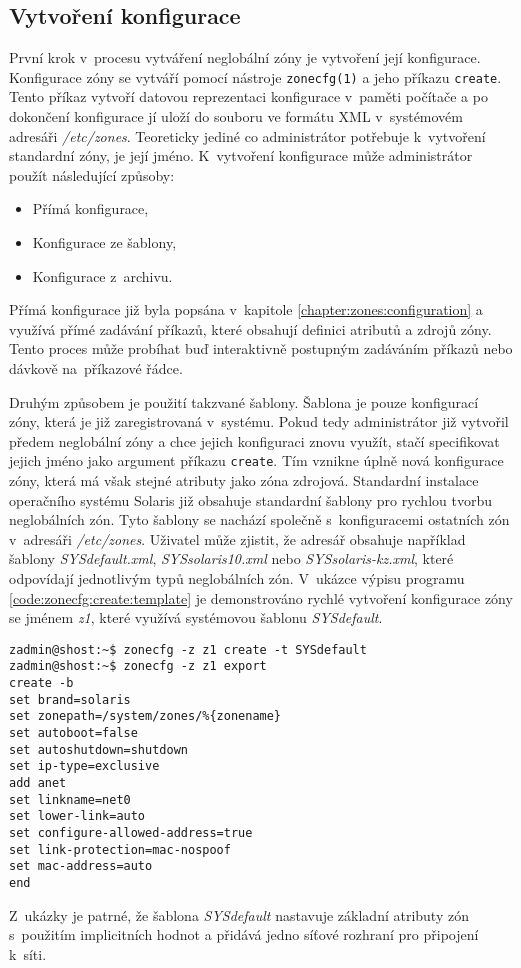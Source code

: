 \subsection{Vytvoření konfigurace}
\label{chapter:zones:configuration:creating}
První krok v~procesu vytváření neglobální zóny je vytvoření její konfigurace. Konfigurace zóny se vytváří pomocí nástroje 
\verb|zonecfg(1)| a jeho příkazu \verb|create|. Tento příkaz vytvoří datovou reprezentaci konfigurace v~paměti počítače a
po dokončení konfigurace jí uloží do souboru ve formátu XML v~systémovém adresáři \textit{/etc/zones}. Teoreticky jediné co
administrátor potřebuje k~vytvoření standardní zóny, je její jméno. K~vytvoření konfigurace může administrátor použít
následující způsoby:
\begin{itemize}
 \item Přímá konfigurace,
 \item Konfigurace ze šablony,
 \item Konfigurace z~archivu.
\end{itemize}
Přímá konfigurace již byla popsána v~kapitole \ref{chapter:zones:configuration} a využívá přímé zadávání příkazů, které obsahují
definici atributů a zdrojů zóny. Tento proces může probíhat buď interaktivně postupným zadáváním příkazů nebo dávkově na~příkazové řádce.

Druhým způsobem je použití takzvané šablony. Šablona je pouze konfigurací zóny, která je již zaregistrovaná
v~systému. Pokud tedy administrátor již vytvořil předem neglobální zóny a chce jejich konfiguraci znovu využít, stačí
specifikovat jejich jméno jako argument příkazu \verb|create|. Tím vznikne úplně nová konfigurace zóny, která má však stejné
atributy jako zóna zdrojová. Standardní instalace operačního systému Solaris již obsahuje standardní šablony pro rychlou tvorbu
neglobálních zón. Tyto šablony se nachází společně s~konfiguracemi ostatních zón v~adresáři \textit{/etc/zones}. Uživatel
může zjistit, že adresář obsahuje například šablony \textit{SYSdefault.xml}, \textit{SYSsolaris10.xml} nebo
\textit{SYSsolaris-kz.xml}, které odpovídají jednotlivým typů neglobálních zón. V~ukázce výpisu programu \ref{code:zonecfg:create:template}
je demonstrováno rychlé vytvoření konfigurace zóny se jménem \textit{z1}, které využívá systémovou šablonu \textit{SYSdefault}.
\begin{lstlisting}[caption={Vytvorení zóny ze systémové šablony}, label={code:zonecfg:create:template}]
zadmin@shost:~$ zonecfg -z z1 create -t SYSdefault
zadmin@shost:~$ zonecfg -z z1 export
create -b
set brand=solaris
set zonepath=/system/zones/%{zonename}
set autoboot=false
set autoshutdown=shutdown
set ip-type=exclusive
add anet
set linkname=net0
set lower-link=auto
set configure-allowed-address=true
set link-protection=mac-nospoof
set mac-address=auto
end
\end{lstlisting}
Z~ukázky je patrné, že šablona \textit{SYSdefault} nastavuje základní atributy zón s~použitím implicitních hodnot a přidává
jedno síťové rozhraní pro připojení k~síti.

